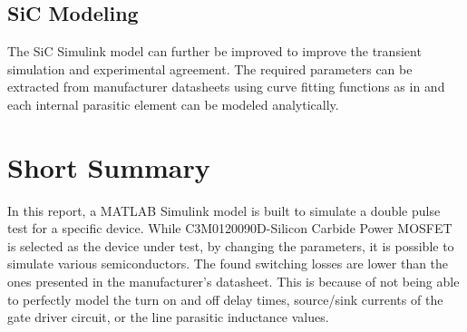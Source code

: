 \documentclass[12pt]{article} %
\begin{document}
\subsection{SiC Modeling}

The SiC Simulink model can further be improved to improve the transient simulation and experimental agreement. The required parameters can be extracted from manufacturer datasheets using curve fitting functions as in \cite{6941012} and each internal parasitic element can be modeled analytically. 



\section{Short Summary}

In this report, a MATLAB Simulink model is built to simulate a double pulse test for a specific device. While C3M0120090D-Silicon Carbide Power MOSFET is selected as the device under test, by changing the parameters, it is possible to simulate various semiconductors. The found switching losses are lower than the ones presented in the manufacturer's datasheet. This is because of not being able to perfectly model the turn on and off delay times, source/sink currents of the gate driver circuit, or the line parasitic inductance values.



\vfill
\end{document}
